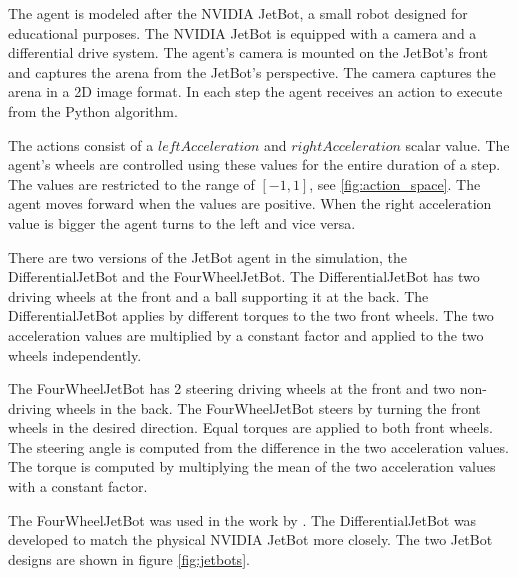 The agent is modeled after the NVIDIA JetBot, a small robot designed for educational purposes. The NVIDIA JetBot is equipped with a camera and a differential drive system. The agent's camera is mounted on the JetBot's front and captures the arena from the JetBot's perspective. The camera captures the arena in a 2D image format. In each step the agent receives an action to execute from the Python algorithm. 

The actions consist of a $leftAcceleration$ and $rightAcceleration$ scalar value. The agent's wheels are controlled using these values for the entire duration of a step. 
The values are restricted to the range of $[-1, 1]$, see \ref{fig:action_space}. The agent moves forward when the values are positive. When the right acceleration value is bigger the agent turns to the left and vice versa.


There are two versions of the JetBot agent in the simulation, the DifferentialJetBot and the FourWheelJetBot. The DifferentialJetBot has two driving wheels at the front and a ball supporting it at the back. The DifferentialJetBot applies by different torques to the two front wheels. The two acceleration values are multiplied by a constant factor and applied to the two wheels independently.

The FourWheelJetBot has 2 steering driving wheels at the front and two non-driving wheels in the back. The FourWheelJetBot steers by turning the front wheels in the desired direction. Equal torques are applied to both front wheels. The steering angle is computed from the difference in the two acceleration values. The torque is computed by multiplying the mean of the two acceleration values with a constant factor.

The FourWheelJetBot was used in the work by \textcite{maximilian}. The DifferentialJetBot was developed to match the physical NVIDIA JetBot more closely. The two JetBot designs are shown in figure \ref{fig:jetbots}.



